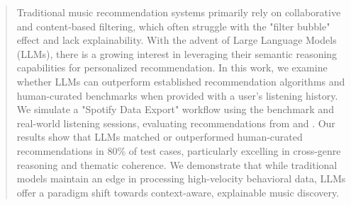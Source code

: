 \begin{abstract}
Traditional music recommendation systems primarily rely on collaborative and content-based filtering, which often struggle with the "filter bubble" effect and lack explainability. With the advent of Large Language Models (LLMs), there is a growing interest in leveraging their semantic reasoning capabilities for personalized recommendation. In this work, we examine whether LLMs can outperform established recommendation algorithms and human-curated benchmarks when provided with a user's listening history. We simulate a "Spotify Data Export" workflow using the \musicrs benchmark and real-world listening sessions, evaluating recommendations from \claudesonnet and \gptfour. Our results show that LLMs matched or outperformed human-curated recommendations in 80\% of test cases, particularly excelling in cross-genre reasoning and thematic coherence. We demonstrate that while traditional models maintain an edge in processing high-velocity behavioral data, LLMs offer a paradigm shift towards context-aware, explainable music discovery.
\end{abstract}
